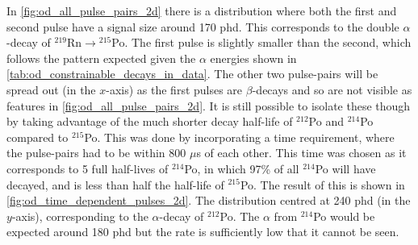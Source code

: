 

\par
In \autoref{fig:od_all_pulse_pairs_2d} there is a distribution where both the first and second pulse have a signal size around 170 phd.
This corresponds to the double $\alpha$-decay of ${}^{219}$Rn$\to{}^{215}$Po.
The first pulse is slightly smaller than the second, which follows the pattern expected given the $\alpha$ energies shown in \autoref{tab:od_constrainable_decays_in_data}.
The other two pulse-pairs will be spread out (in the $x$-axis) as the first pulses are $\beta$-decays and so are not visible as features in \autoref{fig:od_all_pulse_pairs_2d}.
It is still possible to isolate these though by taking advantage of the much shorter decay half-life of ${}^{212}$Po and ${}^{214}$Po compared to ${}^{215}$Po.
This was done by incorporating a time requirement, where the pulse-pairs had to be within 800 $\mu$s of each other.
This time was chosen as it corresponds to 5 full half-lives of ${}^{214}$Po, in which 97\% of all ${}^{214}$Po will have decayed, and is less than half the half-life of ${}^{215}$Po.
The result of this is shown in \autoref{fig:od_time_dependent_pulses_2d}.
The distribution centred at 240 phd (in the $y$-axis), corresponding to the $\alpha$-decay of ${}^{212}$Po.
The $\alpha$ from ${}^{214}$Po would be expected around 180 phd but the rate is sufficiently low that it cannot be seen.


